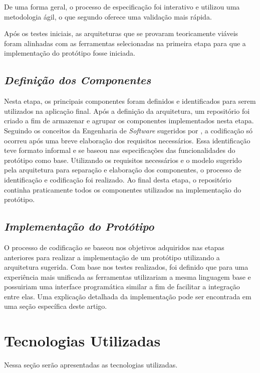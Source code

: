 De uma forma geral, o processo de especificação foi interativo e utilizou uma metodologia ágil, o que segundo \cite{pressman2011} oferece uma validação mais rápida.

Após os testes iniciais, as arquiteturas que se provaram teoricamente viáveis foram alinhadas com as ferramentas selecionadas na primeira etapa para que a implementação do protótipo fosse iniciada.

\subsection{{\it Definição dos Componentes}}

Nesta etapa, os principais componentes foram definidos e identificados para serem utilizados na aplicação final.
Após a definição da arquitetura, um repositório foi criado a fim de armazenar e agrupar os componentes implementados nesta etapa. Seguindo os conceitos da Engenharia de \textit{Software} sugeridos por \cite{pressman2011}, a codificação só ocorreu após uma breve elaboração dos requisitos necessários. Essa identificação teve formato informal e se baseou nas especificações das funcionalidades do protótipo como base. Utilizando os requisitos necessários e o modelo sugerido pela arquitetura para separação e elaboração dos componentes, o processo de identificação e codificação foi realizado. Ao final desta etapa, o repositório continha praticamente todos os componentes utilizados na implementação do protótipo.

\subsection{{\it Implementação do Protótipo}}

O processo de codificação se baseou nos objetivos adquiridos nas etapas anteriores para realizar a implementação de um protótipo utilizando a arquitetura sugerida. Com base nos testes realizados, foi definido que para uma experiência mais unificada as ferramentas utilizariam a mesma linguagem base e possuiriam uma interface programática similar a fim de facilitar a integração entre elas. Uma explicação detalhada da implementação pode ser encontrada em uma seção específica deste artigo.

\section{\esp Tecnologias Utilizadas}
Nessa seção serão apresentadas as tecnologias utilizadas.

